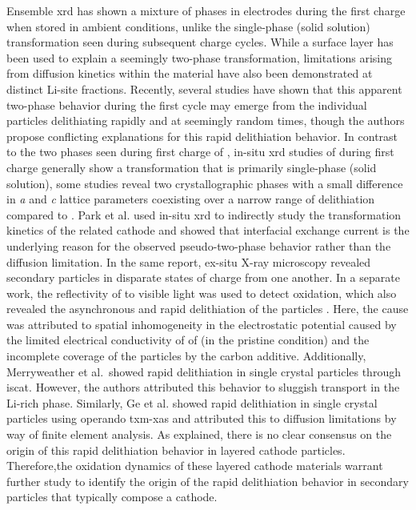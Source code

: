 \documentclass{article}
\begin{document}
Ensemble \gls{xrd} has shown a mixture of phases in \nca{} electrodes
during the first charge when stored in ambient conditions, unlike the
single-phase (solid solution) transformation seen during subsequent
charge cycles\cite{robert2015}. While a  surface layer has
been used to explain a seemingly two-phase
transformation\cite{grenier2017}, limitations arising from diffusion
kinetics within the material have also been demonstrated at distinct
Li-site fractions\cite{chapman2020}. Recently, several studies have
shown that this apparent two-phase behavior during the first cycle may
emerge from the individual particles delithiating rapidly and at
seemingly random times\cite{chueh2021, zhao2022, rao2021, wang2020-6},
though the authors propose conflicting explanations for this rapid
delithiation behavior. In contrast to the two phases seen during first charge of \nca{}, in-situ \gls{xrd}
studies of \nmc[333]{} during first charge generally show a
transformation that is primarily single-phase (solid
solution)\cite{hulzen2018,ahn2017,zhou2016-2}, some studies reveal two
crystallographic phases with a small difference in \emph{a} and
\emph{c} lattice parameters coexisting over a narrow range of
delithiation compared to \nca{}\cite{yoon2006,hua2018}. Park et al. \cite{chueh2021} used in-situ
\gls{xrd} to indirectly study the transformation kinetics of the
related \nmc[333]{} cathode and showed that interfacial exchange
current is the underlying reason for the observed pseudo-two-phase
behavior rather than the  diffusion limitation. In the same
report, ex-situ X-ray microscopy revealed secondary particles in
disparate states of charge from one another. In a separate
work, the reflectivity of \nmc[532]{} to visible light was used to
detect oxidation, which also revealed the asynchronous and rapid
delithiation of the \nmc[532]{} particles \cite{zhao2022}. Here, the
cause was attributed to spatial inhomogeneity in the electrostatic
potential caused by the limited electrical conductivity of of
\nmc[532]{} (in the pristine condition) and the incomplete coverage of
the \nmc[532]{} particles by the carbon additive. Additionally,
Merryweather et al.\cite{rao2021}\ showed rapid delithiation in
 single crystal particles through \gls{iscat}. However, the
authors attributed this behavior to sluggish  transport in the Li-rich phase. Similarly, Ge et al.\cite{wang2020-6} showed rapid
delithiation in \nmc{} single crystal particles using operando
\gls{txm}-\gls{xas} and attributed this to  diffusion
limitations by way of finite element analysis. As explained, there is
no clear consensus on the origin of this rapid delithiation behavior
in layered cathode particles. Therefore,the oxidation dynamics of
these layered cathode materials warrant further study to identify the
origin of the rapid delithiation behavior in secondary
particles that typically compose a cathode.
\end{document}
